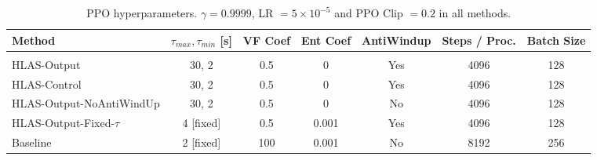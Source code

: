 \documentclass{UnderReview}
\begin{document}
\begin{table*}[h!]
	\renewcommand{\arraystretch}{1.2}
	\caption{PPO hyperparameters. $\gamma=0.9999$, LR $=5\times 10^{-5}$ and PPO Clip $= 0.2$ in all methods.} \label{table:shuttle_baselines_hyperparameters}
	\centering %
	\begin{tabular}{lcccccc}
		\hline {Method} & $\tau_{max}, \tau_{min}$ [s] & {VF Coef} & {Ent Coef} & AntiWindup & {Steps / Proc.} & Batch Size \\
		\hline\vspace{-4mm} &&&&&& \\
		HLAS-Output & 30, 2 & 0.5 & 0 & Yes & 4096 & 128\\ 		
		HLAS-Control & 30, 2 & 0.5 & 0 & Yes & 4096 & 128\\ 
		HLAS-Output-NoAntiWindUp & 30, 2 & 0.5 & 0 & No & 4096 & 128\\ 		
		HLAS-Output-Fixed-$\tau$ & 4 [fixed] & 0.5 & 0.001 & Yes & 4096 & 128\\ 
		Baseline & 2 [fixed] & 100 & 0.001 & No & 8192 & 256\\ 
		\hline		
	\end{tabular} 	
\end{table*}
\end{document}
